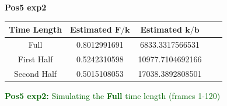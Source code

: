 \documentclass[12pt]{article}
\begin{document}
\vspace*{1in}
{\LARGE \textbf{Pos5 exp2}}
\vspace{.5in}
\begin{table}[h!]
    \begin{center}
    \Large
	\renewcommand{\arraystretch}{1.3}
        \begin{tabular}{|c|c|c|c|c|}
            \hline
		\textbf{Time Length} & \textbf{Estimated} $\boldsymbol F/\boldsymbol k$ & \textbf{Estimated} $\boldsymbol k/\boldsymbol b$ \\ \hline
		Full & 0.8012991691 & 6833.3317566531 \\ \hline
		First Half & 0.5242310598 & 10977.7104692166 \\ \hline
		Second Half & 0.5015108053 & 17038.3892808501 \\ \hline
        \end{tabular}
     \end{center}
\end{table}

\clearpage

\noindent \textcolor{DarkGreen}{\textbf{Pos5 exp2:} Simulating the \textbf{Full} time length (frames 1-120)}
\end{document}
